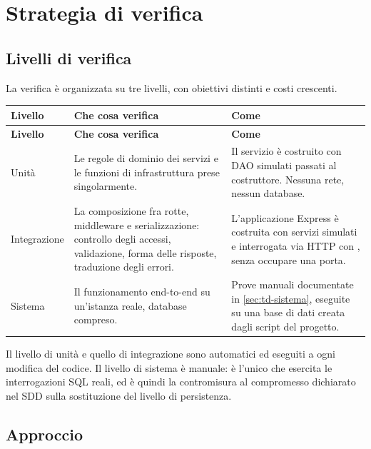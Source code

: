 \chapter{Strategia di verifica}
\label{cap:td-strategia}

\section{Livelli di verifica}

La verifica è organizzata su tre livelli, con obiettivi distinti e costi
crescenti.

\begin{longtable}{@{}L{2.8cm} L{4.4cm} L{6.8cm}@{}}
\toprule
\textbf{Livello} & \textbf{Che cosa verifica} & \textbf{Come} \\
\midrule
\endfirsthead
\toprule
\textbf{Livello} & \textbf{Che cosa verifica} & \textbf{Come} \\
\midrule
\endhead
\bottomrule
\endlastfoot

Unità &
Le regole di dominio dei servizi e le funzioni di infrastruttura prese
singolarmente. &
Il servizio è costruito con DAO simulati passati al costruttore. Nessuna
rete, nessun database. \\

Integrazione &
La composizione fra rotte, middleware e serializzazione: controllo degli
accessi, validazione, forma delle risposte, traduzione degli errori. &
L'applicazione Express è costruita con servizi simulati e interrogata via
HTTP con , senza occupare una porta. \\

Sistema &
Il funzionamento end-to-end su un'istanza reale, database compreso. &
Prove manuali documentate in \cref{sec:td-sistema}, eseguite su una base di
dati creata dagli script del progetto. \\

\end{longtable}

Il livello di unità e quello di integrazione sono automatici ed eseguiti a
ogni modifica del codice. Il livello di sistema è manuale: è l'unico che
esercita le interrogazioni SQL reali, ed è quindi la contromisura al
compromesso dichiarato nel SDD sulla sostituzione del livello di persistenza.

\section{Approccio}

